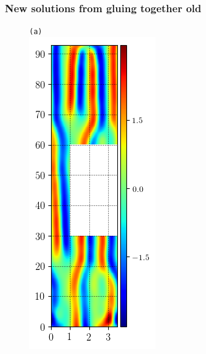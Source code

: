 \documentclass[mathserif, handout]{beamer}
\begin{document}
\begin{frame}
\frametitle{New solutions from gluing together old}
\begin{figure}
\begin{minipage}[height=.48\textheight]{.48\textwidth}
\centering \small{\texttt{(a)}}\\
\includegraphics[width=.8\textwidth,height=.4\textheight]{MNG_ppo_without_HOD}

\end{minipage}
\end{figure}
\end{frame}
\end{document}
